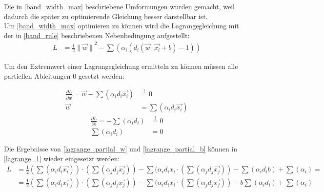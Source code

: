 \documentclass[a4paper,11pt,twoside]{scrreprt}
\begin{document}
Die in \autoref{band_width_max} beschriebene Umformungen wurden gemacht, weil dadurch die später zu optimierende Gleichung besser darstellbar ist. \\

Um \autoref{band_width_max} optimieren zu können wird die Lagrangegleichung mit der in \autoref{band_rule} beschriebenen Nebenbedingung aufgestellt:
\begin{equation} \label{lagrange_1}
    \begin{aligned}
    L &= \frac{1}{2} {\lVert \vec{w} \rVert}^{2} - \sum (\alpha_{i} (d_{i} (\vec{w} \cdot \vec{x_{i}} + b) -1)) 
    \end{aligned}
\end{equation}

Um den Extremwert einer Lagrangegleichung ermitteln zu können müssen alle partiellen Ableitungen 0 gesetzt werden:

\begin{equation} \label{lagrange_partial_w}
    \begin{aligned}
    \frac{\partial L}{\partial \vec{w}} = \vec{w} - \sum (\alpha_{i} d_{i} \vec{x_{i}}) &\overset{!}{=} 0 \\
    \vec{w} &= \sum (\alpha_{i} d_{i} \vec{x_{i}})
    \end{aligned}
\end{equation}
\newline
\begin{equation} \label{lagrange_partial_b}
    \begin{aligned}
    \frac{\partial L}{\partial b} = - \sum (\alpha_{i} d_{i}) &\overset{!}{=} 0 \\
    \sum (\alpha_{i} d_{i}) &= 0
    \end{aligned}
\end{equation}

Die Ergebnisse von \autoref{lagrange_partial_w} und \autoref{lagrange_partial_b} können in \autoref{lagrange_1} wieder eingesetzt werden:
\begin{equation} \label{lagrange_2}
    \begin{aligned}
    L &= \frac{1}{2} (\sum (\alpha_{i} d_{i} \vec{x_{i}})) \cdot (\sum (\alpha_{j} d_{j} \vec{x_{j}})) - \sum (\alpha_{i} d_{i} x_{i} \cdot (\sum (\alpha_{j} d_{j} \vec{x_{j}})) - \sum (\alpha_{i} d_{i} b) + \sum (\alpha_{i}) =\\
    &= \frac{1}{2} (\sum (\alpha_{i} d_{i} \vec{x_{i}})) \cdot (\sum (\alpha_{j} d_{j} \vec{x_{j}})) - \sum (\alpha_{i} d_{i} x_{i} \cdot (\sum (\alpha_{j} d_{j} \vec{x_{j}})) - b \sum (\alpha_{i} d_{i}) + \sum (\alpha_{i})
    \end{aligned}
\end{equation}
\end{document}
